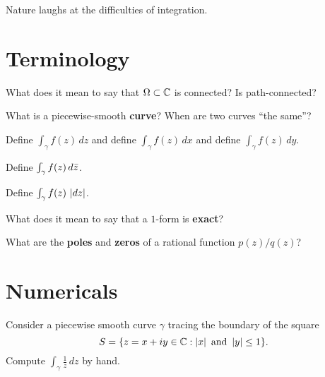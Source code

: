 \documentclass{homework}
\author{Jim Fowler}
\begin{document}
\maketitle

\begin{inspiration}
Nature laughs at the difficulties of integration.
\end{inspiration}

\section{Terminology}

\begin{problem}
  What does it mean to say that $\Omega \subset \mathbb{C}$ is connected?  Is path-connected?  
\end{problem}

\begin{problem}
  What is a piecewise-smooth \textbf{curve}?  When are two curves ``the same''?  
\end{problem}

\begin{problem}
    Define $\int_\gamma f(z) \, dz$ and define $\int_\gamma f(z) \, dx$ and define $\int_\gamma f(z) \, dy$.
\end{problem}

\begin{problem}
  Define $\int_\gamma f(z) \, d\bar{z}$.
\end{problem}

\begin{problem}
  Define $\int_\gamma f(z) \, \left|dz\right|$.
\end{problem}

\begin{problem}
  What does it mean to say that a $1$-form is \textbf{exact}?
\end{problem}

\begin{problem}
  What are the \textbf{poles} and \textbf{zeros} of a rational
  function $p(z)/q(z)$?
\end{problem}

\section{Numericals}

\begin{problem}Consider a piecewise smooth curve $\gamma$ tracing the boundary of the square
  $$S = \{ z = x+iy\in \mathbb{C} : \left|x\right| \mbox{ and } \left|y\right| \leq 1 \}.$$
  Compute $\displaystyle\int_\gamma \frac{1}{z} \, dz$ by hand.
\end{problem}
\end{document}
